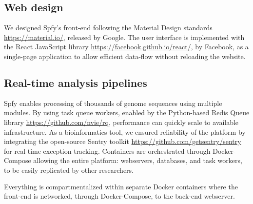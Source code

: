 \documentclass[a4,center,fleqn]{NAR}
\begin{document}
\subsection{Web design}

We designed Spfy's front-end following the Material Design standards \url{https://material.io/}, released by Google.
The user interface is implemented with the React JavaScript library \url{https://facebook.github.io/react/}, by Facebook, as a single-page application to allow efficient data-flow without reloading the website.

\subsection{Real-time analysis pipelines}

Spfy enables processing of thousands of genome sequences using multiple modules.
By using task queue workers, enabled by the Python-based Redis Queue library \url{https://github.com/nvie/rq}, performance can quickly scale to available infrastructure.
As a bioinformatics tool, we ensured reliability of the platform by integrating the open-source Sentry toolkit \url{https://github.com/getsentry/sentry} for real-time exception tracking.
Containers are orchestrated through Docker-Compose allowing the entire platform: webservers, databases, and task workers, to be easily replicated by other researchers.




Everything is compartmentalized within separate Docker containers where the front-end is networked, through Docker-Compose, to the back-end webserver.
\end{document}

